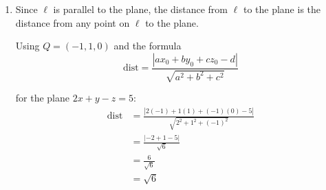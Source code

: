 \documentclass[leqno]{article}
\begin{document}
\begin{enumerate}[
  label=\textbf{\arabic*.},
  leftmargin=*,
  topsep=0pt,
  partopsep=0pt,
  parsep=0pt
]
\begin{djsSolution}
\begin{enumerate}[label=\textbf{(\alph*)}]
\begin{enumerate}[label=(\roman*)]
has normal vector
\[
\mathbf n=
\begin{pmatrix}
2\\
1\\
-1
\end{pmatrix}
\]

The line $\ell$ has direction vector
\[
\mathbf u=
\begin{pmatrix}
1\\
-1\\
1
\end{pmatrix}
\]

Now
\begin{align*}
\mathbf u\cdot \mathbf n
&=
\begin{pmatrix}
1\\
-1\\
1
\end{pmatrix}
\cdot
\begin{pmatrix}
2\\
1\\
-1
\end{pmatrix}\\
&=1(2)+(-1)(1)+1(-1)\\
&=2-1-1\\
&=0
\end{align*}

So $\ell$ is either parallel to the plane or lies in the plane.

Take the point $Q=(-1,1,0)$ on $\ell$. Substituting into the plane equation:
\[
2(-1)+1-0=-1
\]

which is not equal to $5$.

So $Q$ is not on the plane, hence $\ell$ does not lie in the plane.

Therefore $\ell$ is parallel to the plane $2x+y-z=5$.

    \item Since $\ell$ is parallel to the plane, the distance from $\ell$ to the plane is the distance from any point on $\ell$ to the plane.

Using $Q=(-1,1,0)$ and the formula
\[
\mathrm{dist}
=\frac{|ax_0+by_0+cz_0-d|}{\sqrt{a^2+b^2+c^2}}
\]

for the plane $2x+y-z=5$:
\begin{align*}
\mathrm{dist}
&=\frac{|2(-1)+1(1)+(-1)(0)-5|}{\sqrt{2^2+1^2+(-1)^2}}\\
&=\frac{\lvert -2+1-5\rvert}{\sqrt{6}}\\
&=\frac{6}{\sqrt6}\\
&=\sqrt6
\end{align*}


\end{enumerate}
\end{enumerate}
\end{djsSolution}
\end{enumerate}
\end{document}
